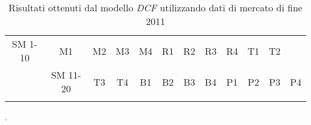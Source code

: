 \begin{sidewaystable}
\begin{center}
\begin{tabular}[c]{|c||*{10}{c|}}
\hline
SM 1-10 & M1 & M2 & M3 & M4 & R1 & R2 & R3 & R4 & T1 & T2  \\
&  
\hline \hline
SM 11-20  & T3 & T4 & B1 & B2 & B3 & B4 & P1 & P2 & P3 & P4  \\
&  
\hline
\end{tabular}
\caption[Risultati per lo scenario di mercato]{Risultati ottenuti dal modello \textit{DCF} utilizzando dati di mercato di fine 2011}.
\label{tab:amsm}
\end{center}
\end{sidewaystable}

